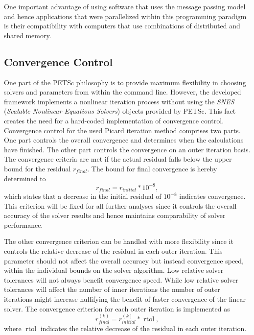 One important advantage of using software that uses the message passing model and hence applications that were parallelized within this programming paradigm is their compatibility with computers that use combinations of distributed and shared memory.

\subsection{Convergence Control} 
\label{sec:convergence}
One part of the PETSc philosophy is to provide maximum flexibility in choosing solvers and parameters from within the command line. However, the developed framework implements a nonlinear iteration process without using the \emph{SNES} (\emph{Scalable Nonlinear Equations Solvers}) objects provided by PETSc. This fact creates the need for a hard-coded implementation of convergence control. Convergence control for the used Picard iteration method comprises two parts. One part controls the overall convergence and determines when the calculations have finished. The other part controls the convergence on an outer iteration basis. The convergence criteria are met if the actual residual falls below the upper bound for the residual \(r_{final}\). The bound for final convergence is hereby determined to
\begin{displaymath}
  r_{final} = r_{initial} * 10^{-8},
\end{displaymath}
which states that a decrease in the initial residual of \(10^{-8}\) indicates convergence. This criterion will be fixed for all further analyses since it controls the overall accuracy of the solver results and hence maintains comparability of solver performance. 

The other convergence criterion can be handled with more flexibility since it controls the relative decrease of the residual in each outer iteration. This parameter should not affect the overall accuracy but instead convergence speed, within the individual bounds on the solver algorithm. Low relative solver tolerances will not always benefit convergence speed. While low relative solver tolerances will affect the number of inner iterations the number of outer iterations might increase nullifying the benefit of faster convergence of the linear solver. The convergence criterion for each outer iteration is implemented as
\begin{displaymath}
  r_{final}^{(k)} = r_{initial}^{(k)} * \operatorname{rtol},
\end{displaymath}
where \(\operatorname{rtol}\) indicates the relative decrease of the residual in each outer iteration. 

